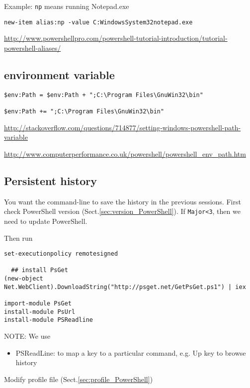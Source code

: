 Example: \verb!np! means running Notepad.exe
\begin{verbatim}
new-item alias:np -value C:WindowsSystem32notepad.exe
\end{verbatim}

\url{http://www.powershellpro.com/powershell-tutorial-introduction/tutorial-powershell-aliases/}

\subsection{environment variable}

\begin{verbatim}
$env:Path = $env:Path + ";C:\Program Files\GnuWin32\bin"

$env:Path += ";C:\Program Files\GnuWin32\bin"
\end{verbatim}

\url{http://stackoverflow.com/questions/714877/setting-windows-powershell-path-variable}


\url{http://www.computerperformance.co.uk/powershell/powershell_env_path.htm}

\subsection{Persistent history}

You want the command-line to save the history in the previous sessions. First
check PowerShell version (Sect.\ref{sec:version_PowerShell}). If \verb!Major<3!,
then we need to update PowerShell.

Then run
\begin{verbatim}
set-executionpolicy remotesigned

  ## install PsGet
(new-object Net.WebClient).DownloadString("http://psget.net/GetPsGet.ps1") | iex

import-module PsGet
install-module PsUrl
install-module PSReadline
\end{verbatim}
NOTE: We use
\begin{itemize}
  \item PSReadLine: to map a key to a particular command, e.g. Up key to browse history
\end{itemize}

Modify profile file (Sect.\ref{sec:profile_PowerShell})


